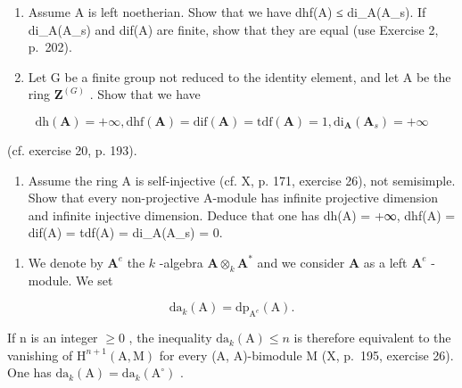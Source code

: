\begin{enumerate}
\def\labelenumi{\alph{enumi})}
\setcounter{enumi}{1}
\item
  Assume A is left noetherian. Show that we have dhf(A) ≤ di\_A(A\_s). If di\_A(A\_s) and dif(A) are finite, show that they are equal (use Exercise 2, p.~202).
\item
  Let G be a finite group not reduced to the identity element, and let A be the ring \(\mathbf{Z}^{(G)}\) . Show that we have
\end{enumerate}

\[
\mathrm{dh} (\mathbf {A}) = + \infty , \mathrm{dhf} (\mathbf {A}) = \mathrm{dif} (\mathbf {A}) = \mathrm{tdf} (\mathbf {A}) = 1, \mathrm{di} _ {\mathbf {A}} (\mathbf {A} _ {s}) = + \infty
\]

(cf. exercise 20, p. 193).

\begin{enumerate}
\def\labelenumi{\alph{enumi})}
\setcounter{enumi}{3}
\tightlist
\item
  Assume the ring A is self-injective (cf. X, p. 171, exercise 26), not semisimple. Show that every non-projective A-module has infinite projective dimension and infinite injective dimension. Deduce that one has dh(A) = +∞, dhf(A) = dif(A) = tdf(A) = di\_A(A\_s) = 0.
\end{enumerate}

\begin{enumerate}
\def\labelenumi{\arabic{enumi})}
\setcounter{enumi}{24}
\tightlist
\item
  We denote by \(\mathbf{A}^e\) the \(k\) -algebra \(\mathbf{A} \otimes_k \mathbf{A}^*\) and we consider \(\mathbf{A}\) as a left \(\mathbf{A}^e\) -module. We set
\end{enumerate}

\[
\mathrm{da} _ {k} (\mathrm{A}) = \mathrm{dp} _ {\mathrm{A} ^ {e}} (\mathrm{A}).
\]

If n is an integer \(\geqslant0\) , the inequality \(\mathrm{da}_{k}(\mathrm{A})\leqslant n\) is therefore equivalent to the vanishing of \(\mathrm{H}^{n+1}(\mathrm{A},\mathrm{M})\) for every (A, A)-bimodule M (X, p.~195, exercise 26). One has \(\mathrm{da}_{k}(\mathrm{A})=\mathrm{da}_{k}(\mathrm{A}^{\circ})\) .

